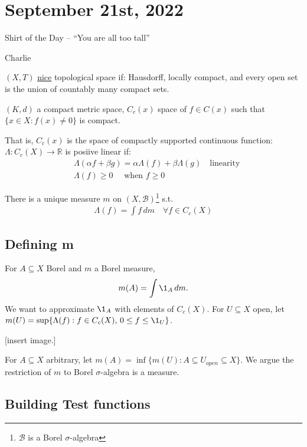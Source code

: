 \section{September 21st, 2022}

\epigraph{Shirt of the Day -- ``You are all too tall''}{Charlie}

\begin{definition}
	$(X,T)$ \underline{nice} topological space if: Hausdorff, locally compact, and every open set is the union of countably many compact sets.
\end{definition}

\begin{example}
	$(K,d)$ a compact metric space, $C_c (x)$ space of $f \in C(x)$ such that $\{x\in X: f(x) \neq 0 \}$ is compact.

	That is, $C_c (x)$ is the space of compactly supported continuous function:
		$\Lambda : C_c(X) \to \mathbb{R}$ is posiive linear if:
	\begin{align*}
		&\Lambda(\alpha f + \beta g) = \alpha \Lambda(f) + \beta \Lambda(g) \quad \text{linearity} \\
		&\Lambda(f) \geq 0 \quad \text{ when } f \geq 0
	\end{align*}
\end{example}

\begin{theorem}
	There is a unique measure $m$ on $(X,\mathcal{B})$\footnote{$\mathcal{B}$ is a Borel $\sigma$-algebra} s.t.
	\begin{align*}
		\Lambda(f) = \int f \, dm \quad \forall f \in C_c (X)
	\end{align*}
\end{theorem}

\subsection{Defining m}
For $A \subseteq X$ Borel and $m$ a Borel measure,
	\[
		m(A) = \int \1_{A} \, dm.
	\]
We want to approximate $\1_A$ with elements of $C_c (X)$.
For $U \subseteq X $ open, let $m(U) = \sup\{\Lambda (f) : f \in C_c (X), \, 0 \leq f \leq \1_{U} \}$.

[insert image.]

For $A \subseteq X$ arbitrary, let $m(A) = \inf\{m(U) : A \subseteq U_{open} \subseteq X\}$.
We argue the restriction of $m$ to Borel $\sigma$-algebra is a measure.

\subsection{Building Test functions}

